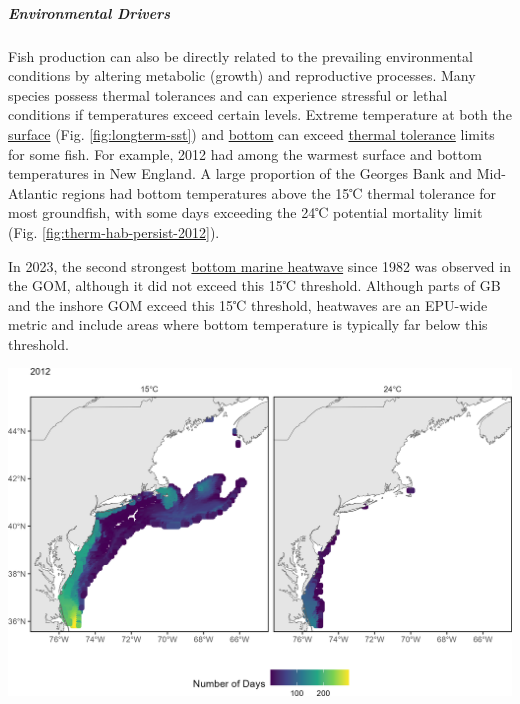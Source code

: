 \documentclass[
  10pt,
]{article}
\let\origfigure\figure
\let\endorigfigure\endfigure
\renewenvironment{figure}[1][2] {
    \expandafter\origfigure\expandafter[H]
} {
    \endorigfigure
}
\begin{document}
\hypertarget{environmental-drivers}{%
\subparagraph{Environmental Drivers}\label{environmental-drivers}}

Fish production can also be directly related to the prevailing environmental conditions by altering metabolic (growth) and reproductive processes. Many species possess thermal tolerances and can experience stressful or lethal conditions if temperatures exceed certain levels. Extreme temperature at both the \href{https://noaa-edab.github.io/catalog/seasonal_oisst_anom.html}{surface} (Fig. \ref{fig:longterm-sst}) and \href{https://noaa-edab.github.io/catalog/bottom_temp_comp.html}{bottom} can exceed \href{https://noaa-edab.github.io/catalog/thermal_habitat_persistence.html}{thermal tolerance} limits for some fish. For example, 2012 had among the warmest surface and bottom temperatures in New England. A large proportion of the Georges Bank and Mid-Atlantic regions had bottom temperatures above the 15℃ thermal tolerance for most groundfish, with some days exceeding the 24℃ potential mortality limit (Fig. \ref{fig:therm-hab-persist-2012}).

In 2023, the second strongest \href{https://noaa-edab.github.io/catalog/heatwave_year.html}{bottom marine heatwave} since 1982 was observed in the GOM, although it did not exceed this 15℃ threshold. Although parts of GB and the inshore GOM exceed this 15℃ threshold, heatwaves are an EPU-wide metric and include areas where bottom temperature is typically far below this threshold.

\begin{figure}

{\centering \includegraphics[width=0.9\linewidth]{images/thermal_habitat_2012_cropped} 

}

\caption{The number of days in 2012 where bottom temperature exceeds 15℃ (left) and 24℃ (right) based on the GLORYS 1/12 degree grid.}\label{fig:therm-hab-persist-2012}
\end{figure}
\end{document}
